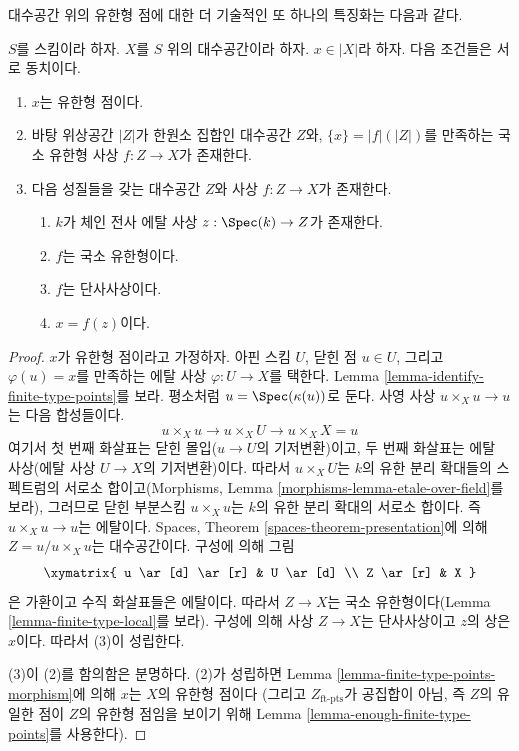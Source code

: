 \noindent
대수공간 위의 유한형 점에 대한 더 기술적인 또 하나의 특징화는 다음과 같다.

\begin{lemma}
\label{lemma-point-finite-type-monomorphism}
$S$를 스킴이라 하자. $X$를 $S$ 위의 대수공간이라 하자.
$x \in |X|$라 하자. 다음 조건들은 서로 동치이다.
\begin{enumerate}
\item $x$는 유한형 점이다.
\item 바탕 위상공간 $|Z|$가 한원소 집합인 대수공간 $Z$와,
$\{x\} = |f|(|Z|)$를 만족하는 국소 유한형 사상 $f : Z \to X$가 존재한다.
\item 다음 성질들을 갖는 대수공간 $Z$와 사상 $f : Z \to X$가 존재한다.
\begin{enumerate}
\item $k$가 체인 전사 에탈 사상 $z : \Spec(k) \to Z$가 존재한다.
\item $f$는 국소 유한형이다.
\item $f$는 단사사상이다.
\item $x = f(z)$이다.
\end{enumerate}
\end{enumerate}
\end{lemma}

\begin{proof}
$x$가 유한형 점이라고 가정하자. 아핀 스킴 $U$, 닫힌 점 $u \in U$,
그리고 $\varphi(u) = x$를 만족하는 에탈 사상
$\varphi : U \to X$를 택한다. Lemma
\ref{lemma-identify-finite-type-points}를 보라.
평소처럼 $u = \Spec(\kappa(u))$로 둔다. 사영 사상
$u \times_X u \to u$는 다음 합성들이다.
$$
u \times_X u \to u \times_X U \to u \times_X X = u
$$
여기서 첫 번째 화살표는 닫힌 몰입($u \to U$의 기저변환)이고,
두 번째 화살표는 에탈 사상(에탈 사상 $U \to X$의 기저변환)이다.
따라서 $u \times_X U$는 $k$의 유한 분리 확대들의 스펙트럼의
서로소 합이고(Morphisms, Lemma
\ref{morphisms-lemma-etale-over-field}를 보라), 그러므로 닫힌 부분스킴
$u \times_X u$는 $k$의 유한 분리 확대의 서로소 합이다. 즉
$u \times_X u \to u$는 에탈이다. Spaces, Theorem
\ref{spaces-theorem-presentation}에 의해
$Z = u/u \times_X u$는 대수공간이다. 구성에 의해 그림
$$
\xymatrix{
u \ar[d] \ar[r] & U \ar[d] \\
Z \ar[r] & X
}
$$
은 가환이고 수직 화살표들은 에탈이다. 따라서 $Z \to X$는
국소 유한형이다(Lemma \ref{lemma-finite-type-local}를 보라).
구성에 의해 사상 $Z \to X$는 단사사상이고 $z$의 상은 $x$이다.
따라서 (3)이 성립한다.

\medskip\noindent
(3)이 (2)를 함의함은 분명하다.
(2)가 성립하면 Lemma \ref{lemma-finite-type-points-morphism}에 의해
$x$는 $X$의 유한형 점이다
(그리고 $Z_{\text{ft-pts}}$가 공집합이 아님, 즉 $Z$의 유일한 점이
$Z$의 유한형 점임을 보이기 위해 Lemma
\ref{lemma-enough-finite-type-points}를 사용한다).
\end{proof}

